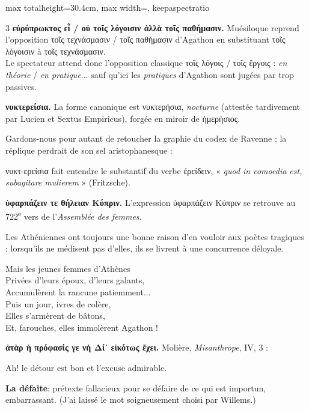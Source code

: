 \documentclass[11pt,twoside]{book}
\newcommand{\italique}[1]{\textit{#1}}
\newcommand{\citComm}[1]{\begin{quoting}[vskip=0.4pt,leftmargin=0.7em,rightmargin=0.2em]#1\end{quoting}}
\newcommand{\nieme}[1]{#1\textsuperscript{e}}
\newcommand{\francais}[1]{{\policeFr #1}}
\newcommand{\latin}[1]{\textit{#1}}
\begin{document}
\begin{adjustbox}{max totalheight=30.4cm, max width=\textwidth, keepaspectratio}
\begin{minipage}{\textwidth}
{\begin{multicols}{3}
 \textbf{εὐρύπρωκτος εἶ / οὐ τοῖς λόγοισιν ἀλλὰ τοῖς παθήμασιν.} Mnésiloque reprend l'opposition τοῖς τεχνάσμασιν / τοῖς παθήμασιν d'Agathon en substituant τοῖς λόγοισιν à τοῖς τεχνάσμασιν.\\ Le spectateur attend donc l'opposition classique τοῖς λόγοις / τοῖς ἔργοις : \italique{en théorie} / \italique{en pratique}... sauf qu'ici les \italique{pratiques} d'Agathon sont jugées par trop passives.
\par\vspace{1.5pt}
 \textbf{νυκτερείσια.} La forme canonique est νυκτερήσια, \italique{nocturne} (attestée tardivement par Lucien et Sextus Empiricus), forgée en miroir de ἡμερήσιος.
\par\vspace{1.5pt}
\noindent Gardons-nous pour autant de retoucher la graphie du codex de Ravenne ; la réplique perdrait de son sel aristophanesque :
\par\vspace{1.5pt}
\noindent νυκτ-ερείσια fait entendre le substantif du verbe ἐρείδειν, « \latin{quod in comoedia est, subagitare mulierem} » (Fritzsche).
\par\vspace{1.5pt}
 \textbf{ὑφαρπάζειν τε θήλειαν Κύπριν.} L'expression ὑφαρπάζειν Κύπριν se retrouve au \nieme{722} vers de l'\italique{Assemblée des femmes}.
\par\vspace{1.5pt}
\noindent Les Athéniennes ont toujours une bonne raison d'en vouloir aux poètes tragiques : lorsqu'ils ne médisent pas d'elles, ils se livrent à une concurrence déloyale.
\citComm{Mais les jeunes femmes d'Athènes\\
Privées d'leurs époux, d'leurs galants,\\
Accumulèrent la rancune patiemment...\\
Puis un jour, ivres de colère,\\
Elles s'armèrent de bâtons,\\
Et, farouches, elles immolèrent Agathon !}
\par\vspace{1.5pt}
 \textbf{ἀτὰρ ἡ πρόφασίς γε νὴ Δί᾽ εἰκότως ἔχει.} Molière, \italique{Misanthrope}, IV, 3 :
\citComm{\francais{Ah! le détour est bon et l'excuse admirable.}}
\par\vspace{1.5pt}
\noindent \textbf{La défaite}: prétexte fallacieux pour se défaire de ce qui est importun, embarrassant. (J'ai laissé le mot soigneusement choisi par Willems.)
\par\end{multicols}}
\end{minipage}\end{adjustbox}
\end{document}
